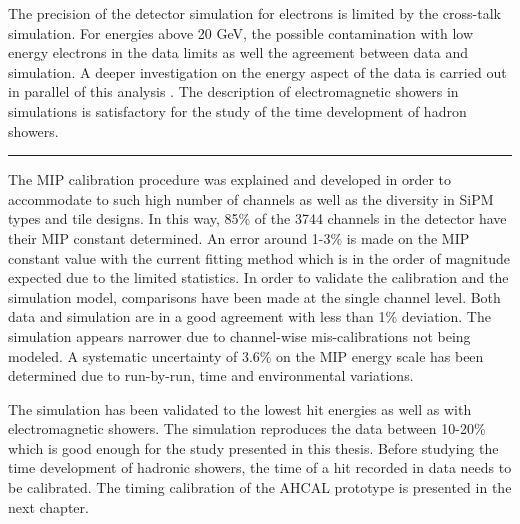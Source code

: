 The precision of the detector simulation for electrons is limited by the cross-talk simulation. For energies above 20 GeV, the possible contamination with low energy electrons in the data limits as well the agreement between data and simulation. A deeper investigation on the energy aspect of the data is carried out in parallel of this analysis \cite{AmbraEnergy}. The description of electromagnetic showers in simulations is satisfactory for the study of the time development of hadron showers.

\begin{center}
	\rule{0.5\textwidth}{.4pt}
\end{center}

The MIP calibration procedure was explained and developed in order to accommodate to such high number of channels as well as the diversity in SiPM types and tile designs. In this way, 85\% of the 3744 channels in the detector have their MIP constant determined. An error around 1-3\% is made on the MIP constant value with the current fitting method which is in the order of magnitude expected due to the limited statistics. In order to validate the calibration and the simulation model, comparisons have been made at the single channel level. Both data and simulation are in a good agreement with less than 1\% deviation. The simulation appears narrower due to channel-wise mis-calibrations not being modeled. A systematic uncertainty of 3.6\% on the MIP energy scale has been determined due to run-by-run, time and environmental variations.

The simulation has been validated to the lowest hit energies as well as with electromagnetic showers. The simulation reproduces the data between 10-20\% which is good enough for the study presented in this thesis. Before studying the time development of hadronic showers, the time of a hit recorded in data needs to be calibrated. The timing calibration of the AHCAL prototype is presented in the next chapter.
